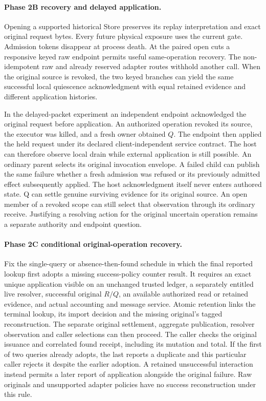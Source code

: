 \documentclass[11pt,a4paper]{article}
\theoremstyle{definition}
\theoremstyle{remark}
\begin{document}
\paragraph{Phase 2B recovery and delayed application.} Opening a supported historical Store preserves its replay interpretation and exact original request bytes. Every future physical exposure uses the current gate. Admission tokens disappear at process death. At the paired open cuts a responsive keyed raw endpoint permits useful same-operation recovery. The non-idempotent raw and already reserved adapter routes withhold another call. When the original source is revoked, the two keyed branches can yield the same successful local quiescence acknowledgment with equal retained evidence and different application histories.

In the delayed-packet experiment an independent endpoint acknowledged the original request before application. An authorized operation revoked its source, the executor was killed, and a fresh owner obtained $Q$. The endpoint then applied the held request under its declared client-independent service contract. The host can therefore observe local drain while external application is still possible. An ordinary parent selects its original invocation envelope. A failed child can publish the same failure whether a fresh admission was refused or its previously admitted effect subsequently applied. The host acknowledgment itself never enters authored state. Q can settle genuine surviving evidence for its original source. An open member of a revoked scope can still select that observation through its ordinary receive. Justifying a resolving action for the original uncertain operation remains a separate authority and endpoint question.

\paragraph{Phase 2C conditional original-operation recovery.} Fix the single-query or absence-then-found schedule in which the final reported lookup first adopts a missing success-policy counter result. It requires an exact unique application visible on an unchanged trusted ledger, a separately entitled live resolver, successful original $R/Q$, an available authorized read or retained evidence, and actual accounting and message service. Atomic retention links the terminal lookup, its import decision and the missing original's tagged reconstruction. The separate original settlement, aggregate publication, resolver observation and caller selections can then proceed. The caller checks the original issuance and correlated found receipt, including its mutation and total. If the first of two queries already adopts, the last reports a duplicate and this particular caller rejects it despite the earlier adoption. A retained unsuccessful interaction instead permits a later report of application alongside the original failure. Raw originals and unsupported adapter policies have no success reconstruction under this rule.
\end{document}
